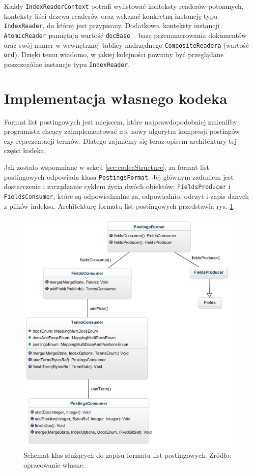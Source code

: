 Każdy \texttt{IndexReaderContext} potrafi wylistować konteksty readerów potomnych, konteksty liści drzewa readerów oraz wskazać konkretną instancję typu \texttt{IndexReader}, do której jest przypisany. Dodatkowo, konteksty instancji \texttt{AtomicReader} pamiętają wartość \texttt{docBase} -- bazę przenumerowania dokumentów oraz swój numer w wewnętrznej tablicy nadrzędnego \texttt{CompositeReadera} (wartość \texttt{ord}). Dzięki temu wiadomo, w jakiej kolejności powinny być przeglądane poszczególne instancje typu \texttt{IndexReader}.

\section{Implementacja własnego kodeka}

Format list postingowych jest miejscem, które najprawdopodobniej zmieniłby programista chcący zaimplementować np. nowy algorytm kompresji postingów czy reprezentacji termów. Dlatego zajmiemy się teraz opisem architektury tej części kodeka. 

Jak zostało wspomniane w sekcji \ref{sec:codecStructure}, za format list postingowych odpowiada klasa \texttt{PostingsFormat}. Jej głównym zadaniem jest dostarczenie i zarządzanie cyklem życia dwóch obiektów: \texttt{FieldsProducer} i \texttt{FieldsConsumer}, które są odpowiedzialne za, odpowiednio, odczyt i zapis danych z plików indeksu. Architekturę formatu list postingowych przedstawia rys. \ref{fig:postingFormat}.

\begin{figure}[p]
 \includegraphics[scale=0.65]{pictures/PostingsFormat_1.jpg}
 \caption{Schemat klas służących do zapisu formatu list postingowych. Źródło: opracowanie własne.\label{fig:postingFormat}}
\end{figure}

